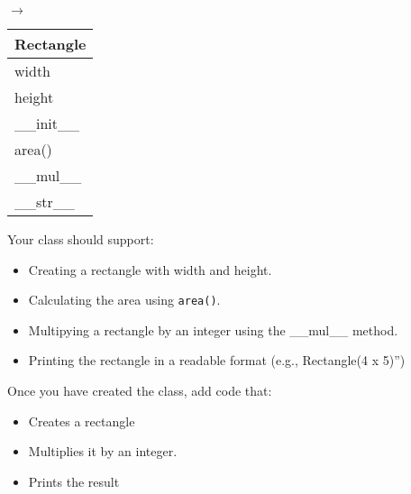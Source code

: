 \documentclass{article}
\newcommand{\csq}[1]{\reflectbox{''}#1''}  %
\begin{document}
\begin{enumerate}
\begin{minipage}[t]{0.7\textwidth}
			\begin{minipage}{0.25\textwidth}
			\end{minipage}
			{\Large $\longrightarrow$} \hspace*{2em}
			\begin{minipage}{0.65\textwidth}
			\end{minipage}
		\end{minipage}
		\hfill
		\begin{minipage}[t]{0.2\textwidth}
			\vspace{.2em}
			\begin{flushright}
				\begin{tabular}{|l|}
					\hline
					Rectangle \\ \hline
					width \\
					height \\ \hline
					\_\_init\_\_ \\
					area() \\
					\_\_mul\_\_ \\
					\_\_str\_\_ \\ \hline
				\end{tabular}
			\end{flushright}
		\end{minipage}
		
		Your class should support:
		\begin{itemize}
			\item Creating a rectangle with width and height.
			\item Calculating the area using \texttt{area()}.
			\item Multipying a rectangle by an integer using the  \_\_mul\_\_ method.
			\item Printing the rectangle in a readable format (e.g., \csq{Rectangle(4 x 5)})
		\end{itemize}
		
		Once you have created the class, add code that:
		\begin{itemize}
			\item Creates a rectangle
			\item Multiplies it by an integer.
			\item Prints the result
		\end{itemize}





\end{enumerate}
\end{document}
